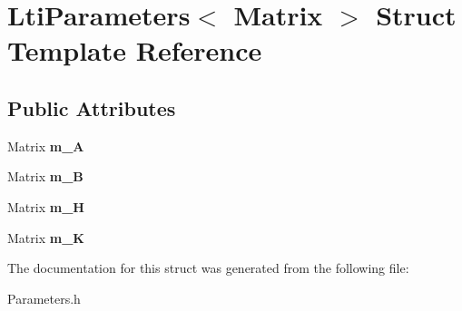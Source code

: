 \hypertarget{structLtiParameters}{}\section{Lti\+Parameters$<$ Matrix $>$ Struct Template Reference}
\label{structLtiParameters}
\subsection*{Public Attributes}
\begin{DoxyCompactItemize}
\item 
\mbox{\label{structLtiParameters_a117a4d148ad3068dc22891c537a48ec4}} 
Matrix {\bfseries m\+\_\+A}
\item 
\mbox{\label{structLtiParameters_a14bf1ac0d0c26c93a4167208837df56f}} 
Matrix {\bfseries m\+\_\+B}
\item 
\mbox{\label{structLtiParameters_afd333012f537cc44f0749d77ab4f8197}} 
Matrix {\bfseries m\+\_\+H}
\item 
\mbox{\label{structLtiParameters_a2970c608cf7d6d4a0e0a01a527e357f5}} 
Matrix {\bfseries m\+\_\+K}
\end{DoxyCompactItemize}


The documentation for this struct was generated from the following file\+:\begin{DoxyCompactItemize}
\item 
Parameters.\+h\end{DoxyCompactItemize}
